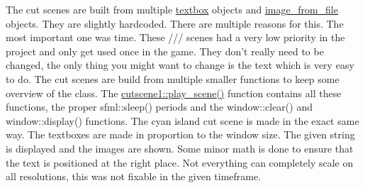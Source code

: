 The cut scenes are built from multiple \hyperlink{classtextbox}{textbox} objects and \hyperlink{classimage__from__file}{image\+\_\+from\+\_\+file} objects. They are slightly hardcoded. There are multiple reasons for this. The most important one was time. These /// scenes had a very low priority in the project and only get used once in the game. They don’t really need to be changed, the only thing you might want to change is the text which is very easy to do. The cut scenes are build from multiple smaller functions to keep some overview of the class. The \hyperlink{classcutscene1_af4c8e7ddc01274a70da482e1d7f56a14}{cutscene1\+::play\+\_\+scene()} function contains all these functions, the proper sfml\+::sleep() periods and the window\+::clear() and window\+::display() functions. The cyan island cut scene is made in the exact same way. The textboxes are made in proportion to the window size. The given string is displayed and the images are shown. Some minor math is done to ensure that the text is positioned at the right place. Not everything can completely scale on all resolutions, this was not fixable in the given timeframe. 